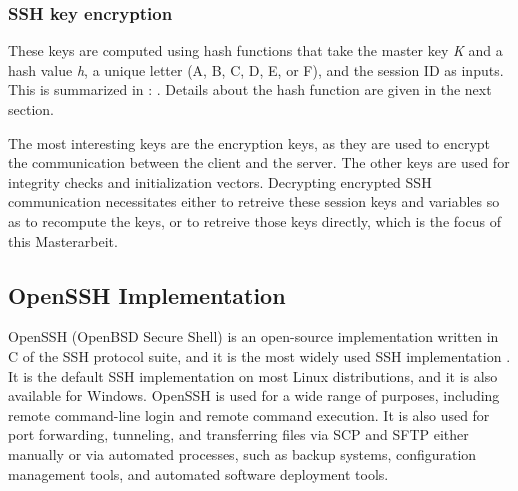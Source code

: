     \subsubsection{SSH key encryption}
    These keys are computed using hash functions that take the master key \textit{K} and a hash value \textit{h}, a unique letter (A, B, C, D, E, or F), and the session ID as inputs. This is summarized in :
     \cite{OpenSSHUnderHood07}. Details about the hash function are given in the next section.
    
    The most interesting keys are the encryption keys, as they are used to encrypt the communication between the client and the server. The other keys are used for integrity checks and initialization vectors. Decrypting encrypted SSH communication necessitates either to retreive these session keys and variables so as to recompute the keys, or to retreive those keys directly, which is the focus of this Masterarbeit. 

    \subsection{OpenSSH Implementation}
    OpenSSH (OpenBSD Secure Shell) is an open-source implementation written in C of the SSH protocol suite, and it is the most widely used SSH implementation \cite{OpenSSHUnderHood07}. It is the default SSH implementation on most Linux distributions, and it is also available for Windows. OpenSSH is used for a wide range of purposes, including remote command-line login and remote command execution. It is also used for port forwarding, tunneling, and transferring files via SCP and SFTP either manually or via automated processes, such as backup systems, configuration management tools, and automated software deployment tools. 

